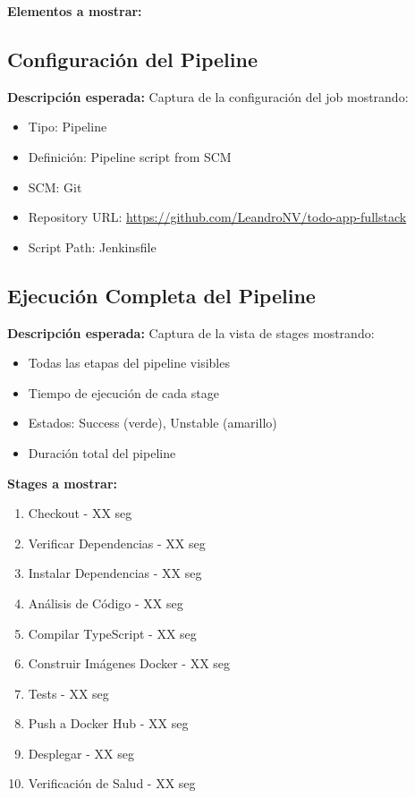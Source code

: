 \documentclass[12pt,a4paper]{article}
\begin{document}
\textbf{Elementos a mostrar:}

\subsection{Configuración del Pipeline}

\textbf{Descripción esperada:} Captura de la configuración del job mostrando:
\begin{itemize}
    \item Tipo: Pipeline
    \item Definición: Pipeline script from SCM
    \item SCM: Git
    \item Repository URL: \url{https://github.com/LeandroNV/todo-app-fullstack}
    \item Script Path: Jenkinsfile
\end{itemize}

\subsection{Ejecución Completa del Pipeline}

\textbf{Descripción esperada:} Captura de la vista de stages mostrando:
\begin{itemize}
    \item Todas las etapas del pipeline visibles
    \item Tiempo de ejecución de cada stage
    \item Estados: Success (verde), Unstable (amarillo)
    \item Duración total del pipeline
\end{itemize}

\textbf{Stages a mostrar:}
\begin{enumerate}
    \item Checkout - XX seg
    \item Verificar Dependencias - XX seg
    \item Instalar Dependencias - XX seg
    \item Análisis de Código - XX seg
    \item Compilar TypeScript - XX seg
    \item Construir Imágenes Docker - XX seg
    \item Tests - XX seg
    \item Push a Docker Hub - XX seg
    \item Desplegar - XX seg
    \item Verificación de Salud - XX seg
\end{enumerate}
\end{document}
